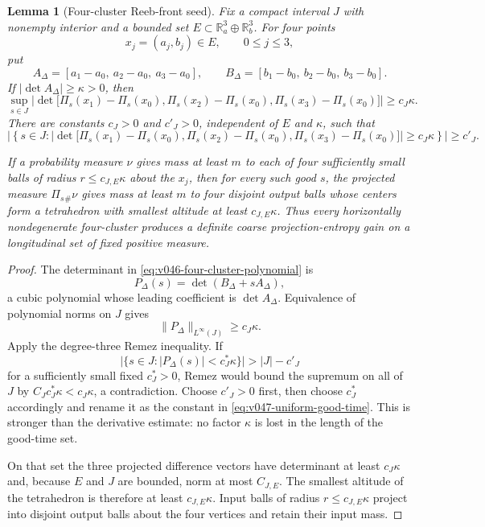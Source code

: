 \documentclass[10pt]{article}
\newtheorem{lemma}[theorem]{Lemma}
\newcommand{\R}{\mathbb R}
\begin{document}
\begin{lemma}[Four-cluster Reeb-front seed]
\label{lem:v046-four-cluster-seed}
Fix a compact interval \(J\) with nonempty interior and a bounded set
\(E\subset\R_a^3\oplus\R_b^3\).  For four points
\[
x_j=(a_j,b_j)\in E,
\qquad 0\le j\le3,
\]
put
\[
A_\Delta=[a_1-a_0,\ a_2-a_0,\ a_3-a_0],
\qquad
B_\Delta=[b_1-b_0,\ b_2-b_0,\ b_3-b_0].
\]
If \(|\det A_\Delta|\ge\kappa>0\), then
\begin{equation}
\label{eq:v046-four-cluster-polynomial}
\boxed{
\sup_{s\in J}
\left|
\det
\bigl[
\Pi_s(x_1)-\Pi_s(x_0),
\Pi_s(x_2)-\Pi_s(x_0),
\Pi_s(x_3)-\Pi_s(x_0)
\bigr]
\right|
\ge c_J\kappa.
}
\end{equation}
There are constants \(c_{J}>0\) and \(c'_{J}>0\), independent of \(E\) and \(\kappa\), such that
\begin{equation}
\label{eq:v047-uniform-good-time}
\boxed{
\left|
\left\{
s\in J:
\left|
\det
\bigl[
\Pi_s(x_1)-\Pi_s(x_0),
\Pi_s(x_2)-\Pi_s(x_0),
\Pi_s(x_3)-\Pi_s(x_0)
\bigr]
\right|
\ge c_J\kappa
\right\}
\right|
\ge c'_J.
}
\end{equation}

If a probability measure \(\nu\) gives mass at least \(m\) to each of four sufficiently small
balls of radius \(r\le c_{J,E}\kappa\) about the \(x_j\), then for every such good \(s\), the
projected measure \(\Pi_s{}_{\#}\nu\) gives mass at least \(m\) to four disjoint output balls whose
centers form a tetrahedron with smallest altitude at least \(c_{J,E}\kappa\).  Thus every
horizontally nondegenerate four-cluster produces a definite coarse projection-entropy gain on a
longitudinal set of fixed positive measure.
\end{lemma}

\begin{proof}
The determinant in \eqref{eq:v046-four-cluster-polynomial} is
\[
P_\Delta(s)=\det(B_\Delta+sA_\Delta),
\]
a cubic polynomial whose leading coefficient is \(\det A_\Delta\).  Equivalence of polynomial
norms on \(J\) gives
\[
\|P_\Delta\|_{L^\infty(J)}\ge c_J\kappa.
\]
Apply the degree-three Remez inequality.  If
\[
\bigl|\{s\in J:|P_\Delta(s)|<c_J^*\kappa\}\bigr|>|J|-c'_J
\]
for a sufficiently small fixed \(c_J^*>0\), Remez would bound the supremum on all of \(J\) by
\(C_Jc_J^*\kappa<c_J\kappa\), a contradiction.  Choose \(c'_J>0\) first, then choose
\(c_J^*\) accordingly and rename it as the constant in
\eqref{eq:v047-uniform-good-time}.  This is stronger than the derivative estimate: no factor
\(\kappa\) is lost in the length of the good-time set.

On that set the three projected difference vectors have determinant at least \(c_J\kappa\) and,
because \(E\) and \(J\) are bounded, norm at most \(C_{J,E}\).  The smallest altitude of the
tetrahedron is therefore at least \(c_{J,E}\kappa\).  Input balls of radius
\(r\le c_{J,E}\kappa\) project into disjoint output balls about the four vertices and retain their
input mass.
\end{proof}
\end{document}
